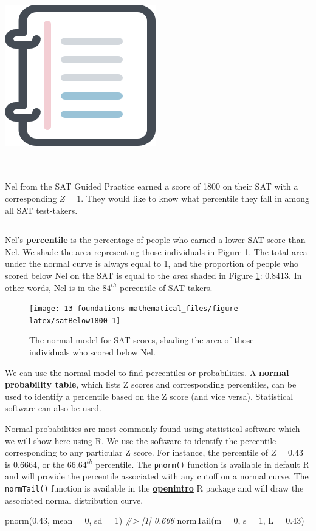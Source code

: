 \documentclass[
  10pt,
  openany]{book}
\newenvironment{Shaded}{\begin{snugshade}}{\end{snugshade}}
\newcommand{\AttributeTok}[1]{\textcolor[rgb]{0.77,0.63,0.00}{#1}}
\newcommand{\CommentTok}[1]{\textcolor[rgb]{0.56,0.35,0.01}{\textit{#1}}}
\newcommand{\DecValTok}[1]{\textcolor[rgb]{0.00,0.00,0.81}{#1}}
\newcommand{\FloatTok}[1]{\textcolor[rgb]{0.00,0.00,0.81}{#1}}
\newcommand{\FunctionTok}[1]{\textcolor[rgb]{0.00,0.00,0.00}{#1}}
\newcommand{\NormalTok}[1]{#1}
\newenvironment{mdframedwithfootGPWE}
{   
    \savenotes
    \begin{mdframed}[%
    topline=true, bottomline=true, linecolor=oiB, linewidth=0.5pt,
    rightline=false, leftline=false,
    backgroundcolor=oiLGray]
    \renewcommand{\thempfootnote}{\arabic{footnote}}
    }
{
    \end{mdframed}
    \spewnotes
}
\newenvironment{workedexample}{
    \let\oldrule\rule
    \renewcommand{\rule}[2]{\vspace{-2mm}\oldrule{##1}{##2}\vspace{-2mm}}
\vspace{4mm}
\begin{mdframedwithfootGPWE}
\begin{minipage}[t]{0.10\textwidth}
{$\:$ \\ \setkeys{Gin}{width=2.5em,keepaspectratio}\includegraphics{images/_icons/worked-example.png}}
\end{minipage}
\hfill
\begin{minipage}[t]{0.90\textwidth}
\vspace{-2mm}
\setlength{\parskip}{1em}
\noindent\textbf{\color{oiB}\small\fontfamily{phv}\selectfont{\MakeUppercase{Example}}} $\:$ \\ \\
}{\end{minipage}
\end{mdframedwithfootGPWE}
\vspace{4mm}
}
\begin{document}
\begin{workedexample}
Nel from the SAT Guided Practice earned a score of 1800 on their SAT with a corresponding \(Z=1.\) They would like to know what percentile they fall in among all SAT test-takers.

\begin{center}\rule{0.5\linewidth}{0.5pt}\end{center}

Nel's \textbf{percentile} is the percentage of people who earned a lower SAT score than Nel.
We shade the area representing those individuals in Figure \ref{fig:satBelow1800}.
The total area under the normal curve is always equal to 1, and the proportion of people who scored below Nel on the SAT is equal to the \emph{area} shaded in Figure \ref{fig:satBelow1800}: 0.8413.
In other words, Nel is in the \(84^{th}\) percentile of SAT takers.

\end{workedexample}

\begin{figure}[h]

{\centering \texttt{[image: 13-foundations-mathematical\_files/figure-latex/satBelow1800-1]} 

}

\caption{The normal model for SAT scores, shading the area of those individuals who scored below Nel.}\label{fig:satBelow1800}
\end{figure}

We can use the normal model to find percentiles or probabilities.
A \textbf{normal probability table}, which lists Z scores and corresponding percentiles, can be used to identify a percentile based on the Z score (and vice versa).
Statistical software can also be used.

Normal probabilities are most commonly found using statistical software which we will show here using R.
We use the software to identify the percentile corresponding to any particular Z score.
For instance, the percentile of \(Z=0.43\) is 0.6664, or the \(66.64^{th}\) percentile.
The \texttt{pnorm()} function is available in default R and will provide the percentile associated with any cutoff on a normal curve.
The \texttt{normTail()} function is available in the \href{http://openintrostat.github.io/openintro/}{\textbf{openintro}} R package and will draw the associated normal distribution curve.

\begin{Shaded}
\begin{Highlighting}[]
\FunctionTok{pnorm}\NormalTok{(}\FloatTok{0.43}\NormalTok{, }\AttributeTok{mean =} \DecValTok{0}\NormalTok{, }\AttributeTok{sd =} \DecValTok{1}\NormalTok{)}
\CommentTok{\#\textgreater{} [1] 0.666}
\FunctionTok{normTail}\NormalTok{(}\AttributeTok{m =} \DecValTok{0}\NormalTok{, }\AttributeTok{s =} \DecValTok{1}\NormalTok{, }\AttributeTok{L =} \FloatTok{0.43}\NormalTok{)}
\end{Highlighting}
\end{Shaded}
\end{document}
